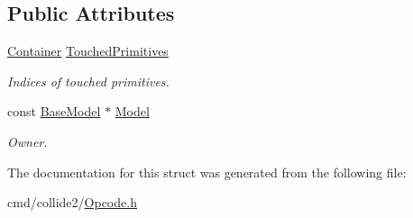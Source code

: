 \subsection*{Public Attributes}
\begin{DoxyCompactItemize}
\item 
\hyperlink{classContainer}{Container} \hyperlink{structOpcode_1_1VolumeCache_a2c25220783f897c83e4c7692ce7b2aac}{Touched\+Primitives}\hypertarget{structOpcode_1_1VolumeCache_a2c25220783f897c83e4c7692ce7b2aac}{}\label{structOpcode_1_1VolumeCache_a2c25220783f897c83e4c7692ce7b2aac}

\begin{DoxyCompactList}\small\item\em Indices of touched primitives. \end{DoxyCompactList}\item 
const \hyperlink{classOpcode_1_1BaseModel}{Base\+Model} $\ast$ \hyperlink{structOpcode_1_1VolumeCache_ad4a7c94f741ae543b17b34cbf814eebe}{Model}\hypertarget{structOpcode_1_1VolumeCache_ad4a7c94f741ae543b17b34cbf814eebe}{}\label{structOpcode_1_1VolumeCache_ad4a7c94f741ae543b17b34cbf814eebe}

\begin{DoxyCompactList}\small\item\em Owner. \end{DoxyCompactList}\end{DoxyCompactItemize}


The documentation for this struct was generated from the following file\+:\begin{DoxyCompactItemize}
\item 
cmd/collide2/\hyperlink{Opcode_8h}{Opcode.\+h}\end{DoxyCompactItemize}
